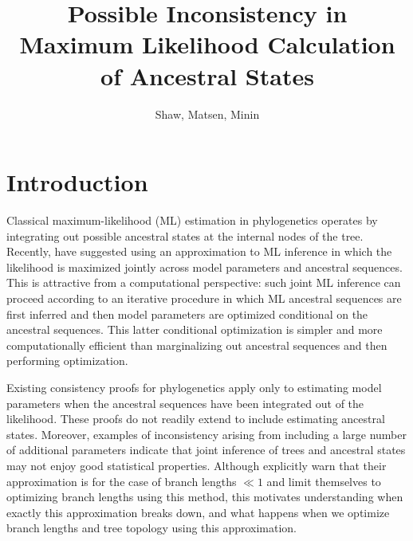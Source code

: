 \documentclass{article}
\title{Possible Inconsistency in Maximum Likelihood Calculation of Ancestral States}
\author{Shaw, Matsen, Minin}
\begin{document}
\maketitle


\renewcommand{\arraystretch}{1.2} %


\section*{Introduction}

Classical maximum-likelihood (ML) estimation in phylogenetics operates by integrating out possible ancestral states at the internal nodes of the tree.
Recently, \cite{Sagulenko2017-jo} have suggested using an approximation to ML inference in which the likelihood is maximized jointly across model parameters and ancestral sequences.
This is attractive from a computational perspective: such joint ML inference can proceed according to an iterative procedure in which ML ancestral sequences are first inferred and then model parameters are optimized conditional on the ancestral sequences.
This latter conditional optimization is simpler and more computationally efficient than marginalizing out ancestral sequences and then performing optimization.

Existing consistency proofs for phylogenetics \cite{RoyChoudhury2015-ta} apply only to estimating model parameters when the ancestral sequences have been integrated out of the likelihood.
These proofs do not readily extend to include estimating ancestral states.
Moreover, examples of inconsistency arising from including a large number of additional parameters \cite{Neyman1948-tt} indicate that joint inference of trees and ancestral states may not enjoy good statistical properties.
Although \cite{Sagulenko2017-jo} explicitly warn that their approximation is for the case of branch lengths $\ll 1$ and limit themselves to optimizing branch lengths using this method, this motivates understanding when exactly this approximation breaks down, and what happens when we optimize branch lengths and tree topology using this approximation.
\end{document}
